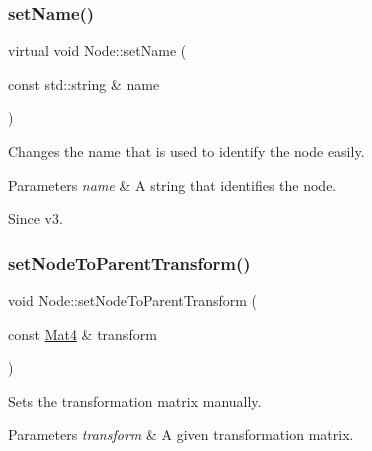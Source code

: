 \subsubsection{\texorpdfstring{set\+Name()}{setName()}\hspace{0.1cm}{\footnotesize\ttfamily [2/2]}}
{\footnotesize\ttfamily virtual void Node\+::set\+Name (\begin{DoxyParamCaption}\item[{const std\+::string \&}]{name }\end{DoxyParamCaption})\hspace{0.3cm}{\ttfamily [virtual]}}

Changes the name that is used to identify the node easily. 
\begin{DoxyParams}{Parameters}
{\em name} & A string that identifies the node.\\
\hline
\end{DoxyParams}
\begin{DoxySince}{Since}
v3. 
\end{DoxySince}
\mbox{\label{classNode_a36afac09102cefcdf692f20358add455}} 
\subsubsection{\texorpdfstring{set\+Node\+To\+Parent\+Transform()}{setNodeToParentTransform()}\hspace{0.1cm}{\footnotesize\ttfamily [1/2]}}
{\footnotesize\ttfamily void Node\+::set\+Node\+To\+Parent\+Transform (\begin{DoxyParamCaption}\item[{const \hyperlink{classMat4}{Mat4} \&}]{transform }\end{DoxyParamCaption})\hspace{0.3cm}{\ttfamily [virtual]}}

Sets the transformation matrix manually.


\begin{DoxyParams}{Parameters}
{\em transform} & A given transformation matrix. \\
\hline
\end{DoxyParams}
\mbox{\label{classNode_a49d96a56bda1b61c829918f771a02a8e}} 
